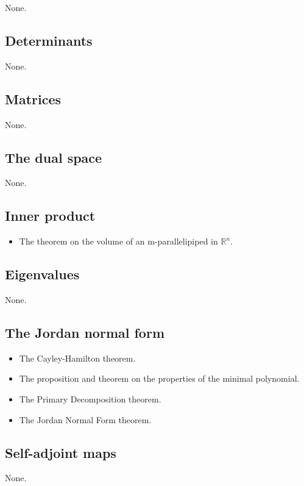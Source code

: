 \documentclass[12pt]{article}
\begin{document}
\begin{multicols}{2}
None.


\subsection{Determinants}

None.


\subsection{Matrices}

None.


\subsection{The dual space}

None.


\subsection{Inner product}

\begin{itemize}
    \item The theorem on the volume of an m-parallelipiped in
        $\mathbb{R}^n$.
\end{itemize}


\subsection{Eigenvalues}

None.


\subsection{The Jordan normal form}

\begin{itemize}
    \item The Cayley-Hamilton theorem.
    \item The proposition and theorem on the properties of the
        minimal polynomial.
    \item The Primary Decomposition theorem.
    \item The Jordan Normal Form theorem.
\end{itemize}


\subsection{Self-adjoint maps}

None.


\end{multicols}
\end{document}
